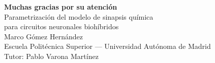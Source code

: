 \documentclass[10pt, aspectratio=169]{beamer}
\begin{document}
\begin{frame}[plain]
    \vfill
    \centering
    {\LARGE\bfseries\textcolor{azuloscuro}{Muchas gracias por su atención}}\\[2em]
    {\large\textcolor{azuloscuro}{Parametrización del modelo de sinapsis química\\para circuitos neuronales biohíbridos}}\\[2.5em]
    {\normalsize\textcolor{grisoscuro}{Marco Gómez Hernández}}\\[1.0em]
    {\scriptsize\textcolor{grismedio}{Escuela Politécnica Superior — Universidad Autónoma de Madrid}}\\[1.4em]
    {\small\textcolor{grismedio}{Tutor: Pablo Varona Martínez}}
    \vfill
\end{frame}
\end{document}
